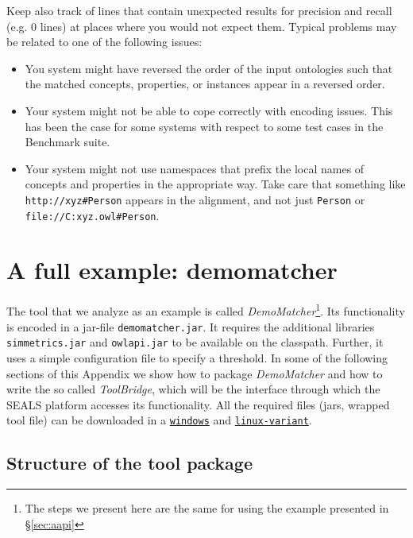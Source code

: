 \documentclass{article}
\def\file#1{\textcolor{grayy}{\texttt{#1}}}
\def\tool#1{\textsl{#1}}
\begin{document}
Keep also track of lines that contain unexpected results for precision and recall (e.g. 0 lines) at places where you would not expect them. Typical problems may be related to one of the following issues:
\begin{itemize}
	\item You system might have reversed the order of the input ontologies such that the matched concepts, properties, or instances appear in a reversed order.
	\item Your system might not be able to cope correctly with encoding issues. This has been the case for some systems with respect to some test cases in the Benchmark suite.
	\item Your system might not use namespaces that prefix the local names of concepts and properties in the appropriate way. Take care that something like \verb|http://xyz#Person| appears in the alignment, and not just \verb|Person| or  \verb|file://C:xyz.owl#Person|.
\end{itemize}

\newpage
\appendix

\section{A full example: demomatcher}
\label{sec:demomatcher}

The tool that we analyze as an example is called \tool{DemoMatcher}\footnote{The steps we present here are the same for using the example presented in \S\ref{sec:aapi}}. Its functionality is encoded in a jar-file \file{demomatcher.jar}. It requires the additional libraries \file{simmetrics.jar} and \file{owlapi.jar} to be available on the classpath. Further, it uses a simple configuration file to specify a threshold. In some of the following sections of this Appendix we show how to package \tool{DemoMatcher} and how to write the so called \emph{ToolBridge}, which will be the interface through which the SEALS platform accesses its functionality. All the required files (jars, wrapped tool file) can be downloaded in a \href{http://oaei.ontologymatching.org/2011/tutorial/windows/demomatcher-package.zip}{\nolinkurl{windows}} and \href{http://oaei.ontologymatching.org/2011/tutorial/linux/demomatcher-package.zip}{\nolinkurl{linux-variant}}.


\subsection{Structure of the tool package}
\label{sec:structure}
\end{document}
